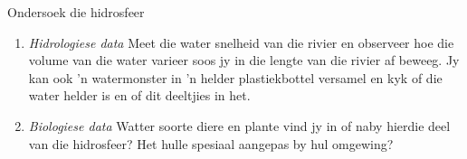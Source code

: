 \begin{Investigation}{Ondersoek die hidrosfeer }
\begin{enumerate}[noitemsep, label=\textbf{\arabic*}. ]
Meet en rekordeer data soos temperatuur, pH, geleidingsvermoë en die opgeloste suurstof by elke ligging. Alhoewel jy moontlik nie op die oomblik verstaan wat hierdie metings beteken nie, sal dit later vir jou duidelik word.
\label{m38138*uid7}\item \textsl{Hidrologiese data}
Meet die water snelheid van die rivier en observeer hoe die volume van die water varieer soos jy in die lengte van die rivier af beweeg. Jy kan ook   'n watermonster in   'n helder plastiekbottel versamel en kyk of die water helder is en of dit deeltjies in het.
\label{m38138*uid8}\item \textsl{Biologiese data}
Watter soorte diere en plante vind jy in of naby hierdie deel van die hidrosfeer? Het hulle spesiaal aangepas by hul omgewing?
\end{enumerate}


\end{Investigation}
